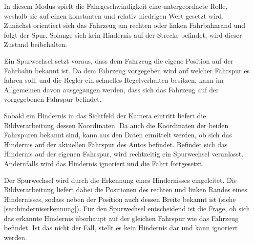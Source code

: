 In diesem Modus spielt die Fahrgeschwindigkeit eine untergeordnete Rolle, weshalb sie auf einen konstanten und relativ niedrigen Wert gesetzt wird. Zunächst orientiert sich das Fahrzeug am rechten oder linken Fahrbahnrand und folgt der Spur. Solange sich kein Hindernis auf der Strecke befindet, wird dieser Zustand beibehalten. 

Ein Spurwechsel setzt voraus, dass dem Fahrzeug die eigene Position auf der Fahrbahn bekannt ist. Da dem Fahrzeug vorgegeben wird auf welcher Fahrspur es fahren soll, und die Regler ein schnelles Regelverhalten besitzen, kann im Allgemeinen davon ausgegangen werden, dass sich das Fahrzeug auf der vorgegebenen Fahrspur befindet.

Sobald ein Hindernis in das Sichtfeld der Kamera eintritt liefert die Bildverarbeitung dessen Koordinaten. Da auch die Koordinaten der beiden Fahrspuren bekannt sind, kann aus den Daten ermittelt werden, ob sich das Hindernis auf der aktuellen Fahrspur des Autos befindet. Befindet sich das Hindernis auf der eigenen Fahrspur, wird rechtzeitig ein Spurwechsel veranlasst. Andernfalls wird das Hindernis ignoriert und die Fahrt fortgesetzt.

Der Spurwechsel wird durch die Erkennung eines Hindernisses eingeleitet. Die Bildverarbeitung liefert dabei die Positionen des rechten und linken Randes eines Hindernisses, sodass neben der Position auch dessen Breite bekannt ist (siehe \autoref{sec:hinderniserkennung}). Für den Spurwechsel entscheidend ist die Frage, ob sich das erkannte Hindernis überhaupt auf der gleichen Fahrspur wie das Fahrzeug befindet. Ist das nicht der Fall, stellt es kein Hindernis dar und kann ignoriert werden.



